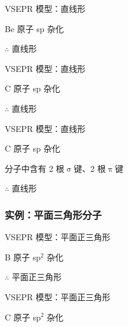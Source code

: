             \noindent\begin{minipage}[t]{0.48\textwidth}
                \noindent\textbf{}
                
                VSEPR 模型：直线形
                
                Be 原子 sp 杂化
                
                \(\therefore\)  直线形
                
                \vspace{\baselineskip}
            
                \noindent\textbf{}
                
                VSEPR 模型：直线形
                
                C 原子 sp 杂化
                
                
                \(\therefore\)  直线形
            \end{minipage}
            \hfill
            \begin{minipage}[t]{0.48\textwidth}
                \noindent\textbf{}
                
                VSEPR 模型：直线形
                
                C 原子 sp 杂化
                
                 分子中含有 2 根\(\upsigma\)键、2 根\(\uppi\)键
                
                \(\therefore\)  直线形
            \end{minipage}

        \subsubsection{实例：平面三角形分子}\label{subsubsec:平面三角形分子}

            \noindent\begin{minipage}[t]{0.48\textwidth}
                \noindent\textbf{}
                
                VSEPR 模型：平面正三角形
                
                B 原子 sp$^2$ 杂化
                
                \(\therefore\)  平面正三角形
            \end{minipage}
            \hfill
            \begin{minipage}[t]{0.48\textwidth}
                \noindent\textbf{}
                
                VSEPR 模型：平面正三角形
                
                C 原子 sp$^2$ 杂化
            \end{minipage}

